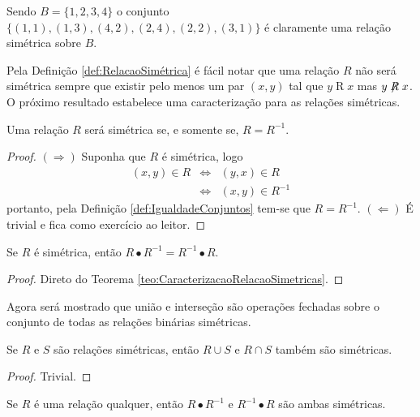 \begin{example}
	Sendo $B = \{1, 2, 3, 4\}$ o conjunto $\{(1, 1), (1, 3), (4, 2), (2, 4), (2, 2), (3, 1)\}$ é claramente uma relação simétrica sobre $B$.
\end{example}

Pela Definição \ref{def:RelacaoSimétrica} é fácil notar que uma relação $R$ não será simétrica sempre que existir pelo menos um par $(x, y)$ tal que $y \mathrel{R} x$ mas $y \centernot{R} x$. O próximo resultado estabelece uma caracterização para as relações simétricas.

\begin{theorem}\label{teo:CaracterizacaoRelacaoSimetricas}
	Uma relação $R$ será simétrica se, e somente se, $R = R^{-1}$.
\end{theorem}

\begin{proof}
	$(\Rightarrow)$ Suponha que $R$ é simétrica, logo
	\begin{eqnarray*}
		(x, y) \in R & \Longleftrightarrow & (y, x) \in R\\
		& \Longleftrightarrow & (x, y) \in R^{-1}
	\end{eqnarray*}
	portanto, pela Definição \ref{def:IgualdadeConjuntos} tem-se que $R = R^{-1}$. $(\Leftarrow)$ É trivial e fica como exercício ao leitor.
\end{proof}


\begin{corollary}
	Se $R$ é simétrica, então $R \bullet R^{-1} = R^{-1} \bullet R$.
\end{corollary}

\begin{proof}
	Direto do Teorema \ref{teo:CaracterizacaoRelacaoSimetricas}.
\end{proof}



Agora será mostrado que união e interseção são operações fechadas sobre o conjunto de todas as relações binárias simétricas.

\begin{theorem}\label{teo:FechamentoSimetricas}
	Se $R$ e $S$ são relações simétricas, então $R \cup S$ e $R \cap S$ também são simétricas.
\end{theorem}

\begin{proof}
	Trivial.
\end{proof}

\begin{theorem}
	Se $R$ é uma relação qualquer, então $R \bullet R^{-1}$ e  $R^{-1} \bullet R$ são ambas simétricas.
\end{theorem}

